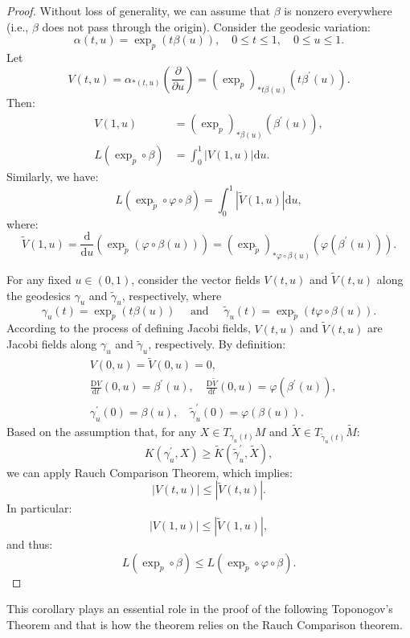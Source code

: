 \documentclass{ctexart}
\begin{document}
\begin{proof}[Proof]
  Without loss of generality, we can assume that $\beta$ is nonzero everywhere (i.e., $\beta$ does not pass through the origin).
  Consider the geodesic variation:
  $$
  \alpha(t, u) = \exp_p(t \beta(u)), \quad 0 \leq t \leq 1, \quad 0 \leq u \leq 1.
  $$
  Let
  $$
  V(t, u) = \alpha_{*(t, u)}\left(\frac{\partial}{\partial u}\right) = \left(\exp_p\right)_{* t \beta(u)}\left(t \beta^{\prime}(u)\right).
  $$
  Then:
  $$
  \begin{aligned}
  V(1, u)  &= \left(\exp_p\right)_{* \beta(u)}\left(\beta^{\prime}(u)\right), \\
  L\left(\exp_p \circ \beta\right) &= \int_0^1|V(1, u)| \mathrm{d} u.
  \end{aligned}
  $$
  Similarly, we have:
  $$
  L\left(\exp_{\tilde{p}} \circ \varphi \circ \beta\right) = \int_0^1|\tilde{V}(1, u)| \mathrm{d} u,
  $$
  where:
  $$
  \tilde{V}(1, u) = \frac{\mathrm{d}}{\mathrm{d} u}\left(\exp_{\tilde{p}}(\varphi \circ \beta(u))\right) = \left(\exp_{\tilde{p}}\right)_{* \varphi \circ \beta(u)}\left(\varphi\left(\beta^{\prime}(u)\right)\right).
  $$

  For any fixed $u \in (0,1)$, consider the vector fields $V(t, u)$ and $\tilde{V}(t, u)$ along the geodesics $\gamma_u$ and $\tilde{\gamma}_u$, respectively, where
  $$
  \gamma_u(t) = \exp_p(t \beta(u)) \quad \text{ and } \quad \tilde{\gamma}_u(t) = \exp_{\tilde{p}}(t \varphi \circ \beta(u)). 
  $$
  According to the process of defining Jacobi fields, $V(t, u)$ and $\tilde{V}(t, u)$ are Jacobi fields along $\gamma_u$ and $\tilde{\gamma}_u$, respectively. By definition:
  $$
  \begin{aligned}
  & V(0, u) = \tilde{V}(0, u) = 0, \\
  & \frac{\mathrm{D} V}{\mathrm{d} t}(0, u) = \beta^{\prime}(u), \quad \frac{\mathrm{D} \tilde{V}}{\mathrm{d} t}(0, u) = \varphi\left(\beta^{\prime}(u)\right), \\
  & \gamma_u^{\prime}(0) = \beta(u), \quad \tilde{\gamma}_u^{\prime}(0) = \varphi(\beta(u)).
  \end{aligned}
  $$
  Based on the assumption that, for any $X \in T_{\gamma_u(t)} M$ and $\tilde{X} \in T_{\tilde{\gamma}_u(t)} \tilde{M}$:
  $$
  K\left(\gamma_u^{\prime}, X\right) \geq \tilde{K}\left(\tilde{\gamma}_u^{\prime}, \tilde{X}\right),
  $$
  we can apply Rauch Comparison Theorem, which implies:
  $$
  |V(t, u)| \leq |\tilde{V}(t, u)|.
  $$
  In particular:
  $$
  |V(1, u)| \leq |\tilde{V}(1, u)|,
  $$
  and thus:
  $$
  L\left(\exp_p \circ \beta\right) \leq L\left(\exp_{\tilde{p}} \circ \varphi \circ \beta\right).
  $$
\end{proof}
This corollary plays an essential role in the proof of the following Toponogov's Theorem and that is how the theorem relies on the Rauch Comparison theorem. 
\end{document}
